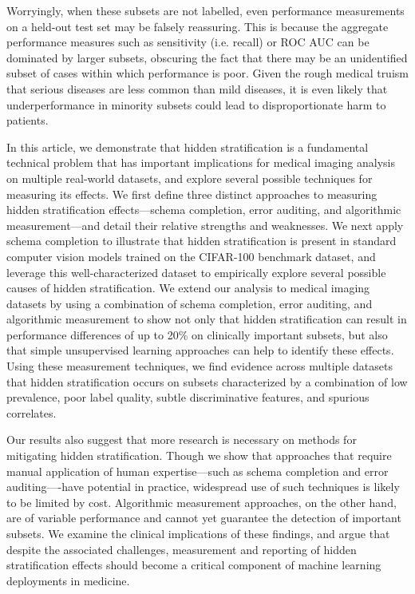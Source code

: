 \documentclass[sigconf,anonymous,review]{acmart}
\begin{document}
Worryingly, when these subsets are not labelled, even performance measurements on a held-out test set may be falsely reassuring. 
This is because the aggregate performance measures such as sensitivity (i.e. recall) or ROC AUC can be dominated by larger subsets, obscuring the fact that there may be an unidentified subset of cases within which performance is poor. 
Given the rough medical truism that serious diseases are less common than mild diseases, it is even likely that underperformance in minority subsets could lead to disproportionate harm to patients.

In this article, we demonstrate that hidden stratification is a fundamental technical problem that has important implications for medical imaging analysis on multiple real-world datasets, and explore several possible techniques for measuring its effects. 
We first define three distinct approaches to measuring hidden stratification effects---schema completion, error auditing, and algorithmic measurement---and detail their relative strengths and weaknesses.
We next apply schema completion to illustrate that hidden stratification is present in standard computer vision models trained on the CIFAR-100 benchmark dataset, and leverage this well-characterized dataset to empirically explore several possible causes of hidden stratification.
We extend our analysis to medical imaging datasets by using a combination of schema completion, error auditing, and algorithmic measurement to show not only that hidden stratification can result in performance differences of up to 20\% on clinically important subsets, but also that simple unsupervised learning approaches can help to identify these effects.  
Using these measurement techniques, we find evidence across multiple datasets that hidden stratification occurs on subsets characterized by a combination of low prevalence, poor label quality, subtle discriminative features, and spurious correlates. 

Our results also suggest that more research is necessary on methods for mitigating hidden stratification.  
Though we show that approaches that require manual application of human expertise---such as schema completion and error auditing----have potential in practice, widespread use of such techniques is likely to be limited by cost.
Algorithmic measurement approaches, on the other hand, are of variable performance and cannot yet guarantee the detection of important subsets.
We examine the clinical implications of these findings, and argue that despite the associated challenges, measurement and reporting of hidden stratification effects should become a critical component of machine learning deployments in medicine.
\end{document}
